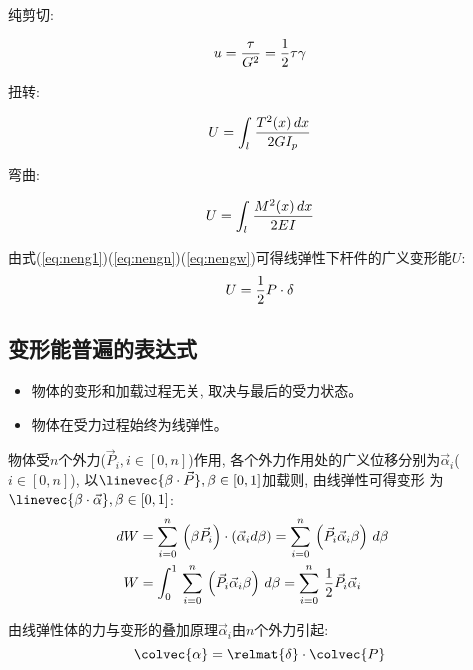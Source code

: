{\desc 纯剪切}:

\begin{equation}
    \label{eq:nengu}
    u = {\tau\over G^2} = {1\over 2}\tau\gamma
\end{equation}

{\desc 扭转}:

\begin{equation}
    \label{eq:nengn}
    U = \int_l\,{T^2(x)\,dx\over2GI_p}
\end{equation}

{\desc 弯曲}:

\begin{equation}
    \label{eq:nengw}
    U = \int_l\,{M^2(x)\,dx\over2EI}
\end{equation}

由式(\ref{eq:neng1})(\ref{eq:nengn})(\ref{eq:nengw})可得线弹性下杆件的广义变形能$U$:
\begin{equation}
    \label{eq:enngg}
    U = {1\over 2}P\cdot\delta
\end{equation}

\subsection{变形能普遍的表达式}

\begin{itemize}
    \item 物体的变形和加载过程无关, 取决与最后的受力状态。
    \item 物体在受力过程始终为线弹性。
\end{itemize}

\indent 物体受$n$个外力(${\vec P_i}, i\in[0, n]$)作用, 各个外力作用处的广义位移分别为${\vec\alpha}_i$($i\in[0, n]$),%
以$\linevec{\beta\cdot{\vec P}}, \beta\in[0, 1]$加载则, 由线弹性可得变形%
为$\linevec{\beta\cdot{\vec\alpha}}, \beta\in[0, 1]$:
\begin{align}
    dW & = \sum_{i=0}^n\,{\left(\beta {\vec P_i}\right)\cdot\left({\vec\alpha}_i d\beta\right)} =%
    \sum_{i=0}^n\,{\left({\vec P_i}{\vec\alpha}_i\beta\right)\,d\beta}\label{eq:gyybnd}\cr
    W & = \int_0^1\,{\sum_{i=0}^n\,{\left({\vec P_i}{\vec\alpha}_i\beta\right)\,d\beta}} = %
    \sum_{i=0}^n\,{1\over 2}{\vec P_i} {\vec\alpha}_i
\end{align}

由线弹性体的力与变形的叠加原理${\vec\alpha_i}$由$n$个外力引起:
\begin{equation}
    \label{eq:ldjz}
    \colvec{\alpha} = \relmat{\delta}\cdot\colvec{P}
\end{equation}

